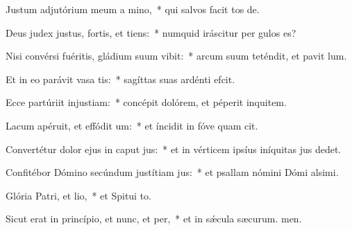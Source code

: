 \item Justum adjutórium meum a mino,~* qui salvos facit tos de.
\item Deus judex justus, fortis, et tiens:~* numquid iráscitur per gulos es?
\item Nisi convérsi fuéritis, gládium suum vibit:~* arcum suum teténdit, et pavit lum.
\item Et in eo parávit vasa tis:~* sagíttas suas ardénti efcit.
\item Ecce partúriit injustiam:~* concépit dolórem, et péperit inquitem.
\item Lacum apéruit, et effódit um:~* et íncidit in fóve quam cit.
\item Convertétur dolor ejus in caput jus:~* et in vérticem ipsíus iníquitas jus dedet.
\item Confitébor Dómino secúndum justítiam jus:~* et psallam nómini Dómi alsimi.
\item Glória Patri, et lio,~* et Spitui to.
\item Sicut erat in princípio, et nunc, et per,~* et in sǽcula sæcurum. men.

